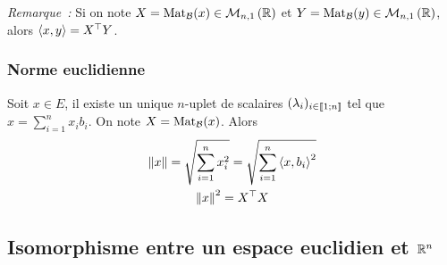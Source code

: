     \emph{Remarque~:} Si on note \(X=\mathrm{Mat}_{\mathcal{B}}(x) \in \mathcal{M}_{n,1}\left(\mathbb{R}\right)\) et \(Y=\mathrm{Mat}_{\mathcal{B}}(y) \in \mathcal{M}_{n,1}\left(\mathbb{R}\right)\), alors \(\left\langle{x},{y}\right\rangle = X^{\top}Y\).

    \subsubsection{Norme euclidienne}

    Soit \(x \in E\), il existe un unique \(n\)-uplet de scalaires \((\lambda_i)_{i \in \mathopen{\llbracket}1\mathclose{}\mathpunct{};n\mathclose{\rrbracket}}\) tel que \(x = \sum_{i=1}^n x_i b_i\). On note \(X = \mathrm{Mat}_{\mathcal{B}}(x)\). Alors
    \begin{gather}
      \left\lVert x\right\rVert = \sqrt{\sum_{i=1}^n x_i^2}=\sqrt{\sum_{i=1}^n \left\langle{x},{b_i}\right\rangle^2} \\
      \left\lVert x\right\rVert^2 = X^\top X
    \end{gather}

    \subsection{Isomorphisme entre un espace euclidien et \(\mathbb{R}^n\)}

